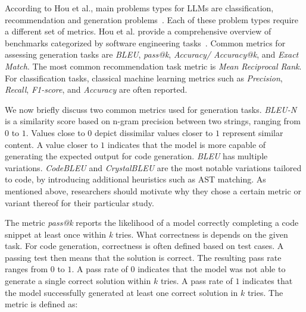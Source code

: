 According to Hou et al., main problems types for LLMs are classification, recommendation and generation problems~\cite{10.1145/3695988}.
Each of these problem types require a different set of metrics.
 Hou et al. provide a comprehensive overview of benchmarks categorized by software engineering tasks~\cite{10.1145/3695988}.
Common metrics for assessing generation tasks are \emph{BLEU}, \emph{pass@k}, \emph{Accuracy/ Accuracy@k}, and \emph{Exact Match}.
The most common recommendation task metric is \emph{Mean Reciprocal Rank}.
For classification tasks, classical machine learning metrics such as \emph{Precision}, \emph{Recall}, \emph{F1-score}, and \emph{Accuracy} are often reported.

We now briefly discuss two common metrics used for generation tasks.
\emph{BLEU-N} \cite{DBLP:conf/acl/PapineniRWZ02} is a similarity score based on n-gram precision between two strings, ranging from $0$ to $1$.
Values close to $0$ depict dissimilar values closer to $1$ represent similar content.
A value closer to $1$ indicates that the model is more capable of generating the expected output for code generation.
\emph{BLEU} has multiple variations.
\emph{CodeBLEU} \cite{DBLP:journals/corr/abs-2009-10297} and \emph{CrystalBLEU} \cite{DBLP:conf/kbse/EghbaliP22} are the most notable variations tailored to code, by introducing additional heuristics such as AST matching.
As mentioned above, researchers should motivate why they chose a certain metric or variant thereof for their particular study.

The metric \emph{pass@k} reports the likelihood of a model correctly completing a code snippet at least once within \emph{k} tries.
What correctness is depends on the given task.
For code generation, correctness is often defined based on test cases. A passing test then means that the solution is correct.
The resulting pass rate ranges from $0$ to $1$.
A pass rate of $0$ indicates that the model was not able to generate a single correct solution within $k$ tries.
A pass rate of $1$ indicates that the model successfully generated at least one correct solution in $k$ tries.
The metric is defined as:

